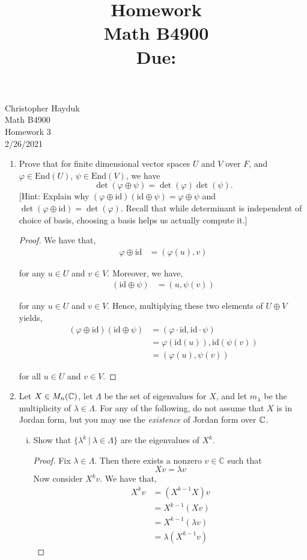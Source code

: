 \documentclass[11pt, reqno]{amsart}
\title[Homework \HW]{Homework \HW \\
Math B4900\\
\small Due: \DUE}
\author{}
\theoremstyle{plain}
\theoremstyle{definition}
\theoremstyle{example}
\def\End{\mathrm{End}}
\def\id{\mathrm{id}}
\def\f{\varphi}
\def\HW{3}
\def\DUE{2/26/2021}
\begin{document}
\begin{flushright}
Christopher Hayduk\\
Math B4900\\
Homework \HW\\
\DUE
\end{flushright}



\begin{enumerate}[1.]
\item Prove that for finite dimensional vector spaces $U$ and $V$ over $F$, and $\f \in \End(U)$, $\psi \in \End(V)$, we have 
$$\det( \f \oplus \psi) = \det(\f)\det(\psi).$$
{[Hint: Explain why $(\f \oplus \id)(\id \oplus \psi) = \f \oplus \psi$ and $\det(\f \oplus \id)= \det(\f)$. Recall that while determinant is independent of choice of basis, choosing a basis helps us actually compute it.]}
\begin{proof}
We have that,
\begin{align*}
\f \oplus \id &= (\f(u), v)
\end{align*}

for any $u \in U$ and $v \in V$. Moreover, we have,
\begin{align*}
(\id \oplus \psi) &= (u, \psi(v))
\end{align*}

for any $u \in U$ and $v \in V$. Hence, multiplying these two elements of $U \oplus V$ yields,
\begin{align*}
(\f \oplus \id)(\id \oplus \psi) &= (\f \cdot \id, \id \cdot \psi)\\
&= \f(\id(u)), \id(\psi(v))\\
&= (\f(u), \psi(v))
\end{align*}

for all $u \in U$ and $v \in V$.

\end{proof}


\item  Let $X \in M_n(\mathbb{C})$, let $\Lambda$ be the set of eigenvalues for $X$, and let $m_\lambda$ be the multiplicity of $\lambda \in \Lambda$. For any of the following, do not assume that $X$ is in Jordan form, but you may use the \emph{existence} of Jordan form over $\mathbb{C}$.
\begin{enumerate}[(i)]
\item Show that $\{\lambda^k ~|~ \lambda \in \Lambda\}$ are the eigenvalues of $X^k$.
\begin{proof}
Fix $\lambda \in \Lambda$. Then there exists a nonzero $v \in \mathbb{C}$ such that $$Xv = \lambda v$$ Now consider $X^kv$. We have that,
\begin{align*}
X^kv &= (X^{k-1}X)v\\
&= X^{k-1}(Xv)\\
&= X^{k-1}(\lambda v)\\
&= \lambda(X^{k-1}v)
\end{align*}


\end{proof}
\end{enumerate}
\end{enumerate}
\end{document}
